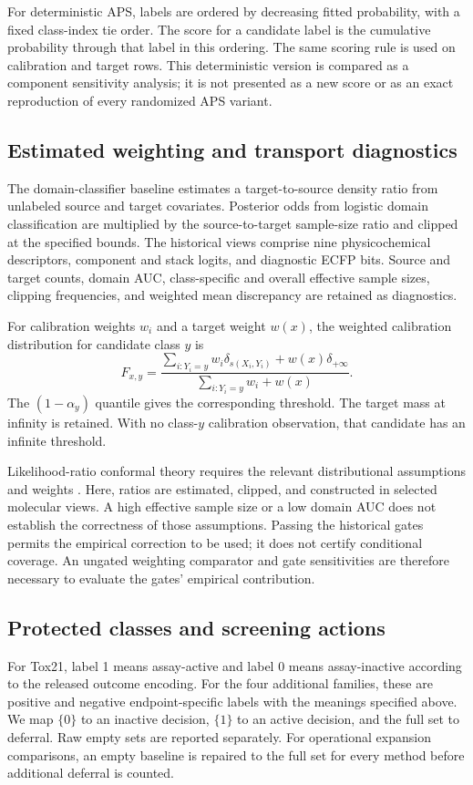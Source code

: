 \documentclass[11pt]{article}
\begin{document}
For deterministic APS, labels are ordered by decreasing fitted probability, with a fixed class-index tie order. The score for a candidate label is the cumulative probability through that label in this ordering. The same scoring rule is used on calibration and target rows. This deterministic version is compared as a component sensitivity analysis; it is not presented as a new score or as an exact reproduction of every randomized APS variant.

\subsection{Estimated weighting and transport diagnostics}
The domain-classifier baseline estimates a target-to-source density ratio from unlabeled source and target covariates. Posterior odds from logistic domain classification are multiplied by the source-to-target sample-size ratio and clipped at the specified bounds. The historical views comprise nine physicochemical descriptors, component and stack logits, and diagnostic ECFP bits. Source and target counts, domain AUC, class-specific and overall effective sample sizes, clipping frequencies, and weighted mean discrepancy are retained as diagnostics.

For calibration weights $w_i$ and a target weight $w(x)$, the weighted calibration distribution for candidate class $y$ is
\begin{equation}
 F_{x,y}=\frac{\sum_{i:Y_i=y} w_i\delta_{s(X_i,Y_i)}+w(x)\delta_{+\infty}}
 {\sum_{i:Y_i=y}w_i+w(x)}.
\end{equation}
The $(1-\alpha_y)$ quantile gives the corresponding threshold. The target mass at infinity is retained. With no class-$y$ calibration observation, that candidate has an infinite threshold.

Likelihood-ratio conformal theory requires the relevant distributional assumptions and weights \citep{tibshirani2019}. Here, ratios are estimated, clipped, and constructed in selected molecular views. A high effective sample size or a low domain AUC does not establish the correctness of those assumptions. Passing the historical gates permits the empirical correction to be used; it does not certify conditional coverage. An ungated weighting comparator and gate sensitivities are therefore necessary to evaluate the gates' empirical contribution.

\subsection{Protected classes and screening actions}
For Tox21, label 1 means assay-active and label 0 means assay-inactive according to the released outcome encoding. For the four additional families, these are positive and negative endpoint-specific labels with the meanings specified above. We map $\{0\}$ to an inactive decision, $\{1\}$ to an active decision, and the full set to deferral. Raw empty sets are reported separately. For operational expansion comparisons, an empty baseline is repaired to the full set for every method before additional deferral is counted.
\end{document}
